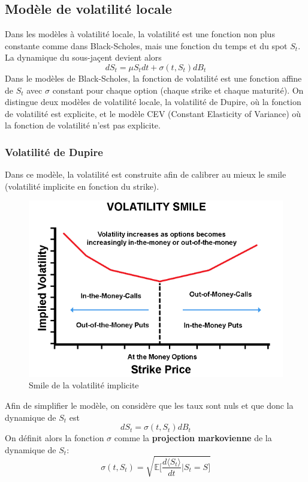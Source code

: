 \documentclass[a4paper]{article}
\begin{document}
\subsection{Modèle de volatilité locale}

Dans les modèles à volatilité locale, la volatilité est une fonction non plus constante comme dans Black-Scholes, mais une fonction du temps et du spot $S_t$. La dynamique du sous-jaçent devient alors
\begin{equation*}
    dS_t = \mu S_t dt + \sigma(t, S_t) dB_t
\end{equation*}
Dans le modèles de Black-Scholes, la fonction de volatilité est une fonction affine de $S_t$ avec $\sigma$ constant pour chaque option (chaque strike et chaque maturité). On distingue deux modèles de volatilité locale, la volatilité de Dupire, où la fonction de volatilité est explicite, et le modèle CEV (Constant Elasticity of Variance) où la fonction de volatilité n'est pas explicite.
\subsubsection{Volatilité de Dupire}

Dans ce modèle, la volatilité est construite afin de calibrer au mieux le smile (volatilité implicite en fonction du strike).
\begin{figure}[H]
    \centering
    \includegraphics[scale=0.5]{figures/volatility-smile.png}
    \caption{Smile de la volatilité implicite}
    \label{fig:enter-label}
\end{figure}
Afin de simplifier le modèle, on considère que les taux sont nuls et que donc la dynamique de $S_t$ est
\begin{equation*}
    dS_t = \sigma (t, S_t) dB_t
\end{equation*}
On définit alors la fonction $\sigma$ comme la \textbf{projection markovienne} de la dynamique de $S_t$:
\begin{equation}
    \sigma (t, S_t) = \sqrt{ \mathbb{E} \bigg[ \frac{d\langle S_t \rangle}{dt} \bigg| S_t = S \bigg] }
\end{equation}
\end{document}

